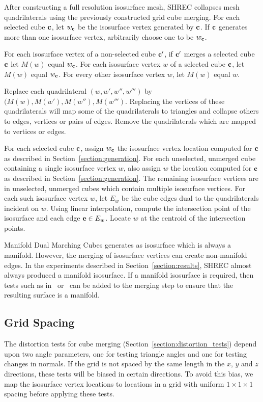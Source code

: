After constructing a full resolution isosurface mesh,
SHREC collapses mesh quadrilaterals
using the previously constructed grid cube merging.
For each selected cube $\mathbf{c}$,
let $w_{\mathbf{c}}$ be the isosurface vertex generated by $\mathbf{c}$.
If $\mathbf{c}$ generates more than one isosurface vertex,
arbitrarily choose one to be $w_{\mathbf{c}}$.

For each isosurface vertex of a non-selected cube $\mathbf{c}'$,
if $\mathbf{c}'$ merges a selected cube $\mathbf{c}$
let $M(w)$ equal $w_{\mathbf{c}}$.
For each isosurface vertex $w$ of a selected cube $\mathbf{c}$, 
let $M(w)$ equal $w_{\mathbf{c}}$.
For every other isosurface vertex $w$, let $M(w)$ equal $w$.

Replace each quadrilateral $(w,w',w'',w''')$
by $(M(w), M(w'), M(w''), M(w''')$.
Replacing the vertices of these quadrilaterals
will map some of the quadrilaterals to triangles
and collapse others to edges, vertices or pairs of edges.
Remove the quadrilaterals which are mapped 
to vertices or edges.

For each selected cube $\mathbf{c}$,
assign $w_{\mathbf{c}}$ the isosurface vertex location computed for $\mathbf{c}$
as described in Section~\ref{section:generation}.
For each unselected, unmerged cube containing a single isosurface vertex $w$,
also assign $w$ the location computed for $\mathbf{c}$
as described in Section~\ref{section:generation}.
The remaining isosurface vertices are in unselected, unmerged cubes
which contain multiple isosurface vertices.
For each such isosurface vertex $w$,
let $E_w$ be the cube edges dual to the quadrilaterals incident on $w$.
Using linear interpolation,
compute the intersection point of the isosurface and each edge $\mathbf{e} \in E_w$.
Locate $w$ at the centroid of the intersection points.

Manifold Dual Marching Cubes generates as isosurface 
which is always a manifold.
However, the merging of isosurface vertices can create non-manifold edges.
In the experiments described in Section~\ref{section:results},
SHREC almost always produced a manifold isosurface.
If a manifold isosurface is required,
then tests such as in~\cite{degn-tpec-98} or~\cite{sjw-mdc-07}
can be added to the merging step
to ensure that the resulting surface is a manifold.


\subsection{Grid Spacing}
\label{section:spacing}

The distortion tests for cube merging (Section~\ref{section:distortion_tests})
depend upon two angle parameters,
one for testing triangle angles and one for testing changes in normals.
If the grid is not spaced by the same length 
in the $x$, $y$ and $z$ directions,
these tests will be biased in certain directions.
To avoid this bias,
we map the isosurface vertex locations
to locations in a grid with uniform $1 \times 1 \times 1$ spacing
before applying these tests.

